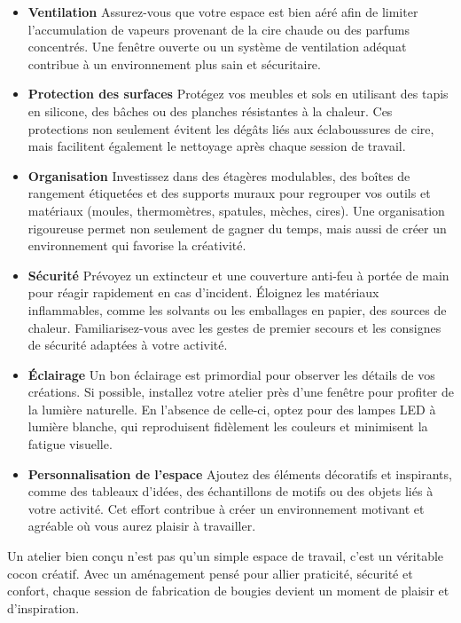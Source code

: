 \documentclass[11pt,fleqn,onecolumn,oneside]{book}
\begin{document}
\begin{itemize}
    \item \textbf{Ventilation} 
    Assurez-vous que votre espace est bien aéré afin de limiter l’accumulation de vapeurs provenant de la cire chaude ou des parfums concentrés. Une fenêtre ouverte ou un système de ventilation adéquat contribue à un environnement plus sain et sécuritaire.

    \item \textbf{Protection des surfaces} 
    Protégez vos meubles et sols en utilisant des tapis en silicone, des bâches ou des planches résistantes à la chaleur. Ces protections non seulement évitent les dégâts liés aux éclaboussures de cire, mais facilitent également le nettoyage après chaque session de travail.

    \item \textbf{Organisation} 
    Investissez dans des étagères modulables, des boîtes de rangement étiquetées et des supports muraux pour regrouper vos outils et matériaux (moules, thermomètres, spatules, mèches, cires). Une organisation rigoureuse permet non seulement de gagner du temps, mais aussi de créer un environnement qui favorise la créativité.

    \item \textbf{Sécurité} 
    Prévoyez un extincteur et une couverture anti-feu à portée de main pour réagir rapidement en cas d’incident. Éloignez les matériaux inflammables, comme les solvants ou les emballages en papier, des sources de chaleur. Familiarisez-vous avec les gestes de premier secours et les consignes de sécurité adaptées à votre activité.

    \item \textbf{Éclairage} 
    Un bon éclairage est primordial pour observer les détails de vos créations. Si possible, installez votre atelier près d’une fenêtre pour profiter de la lumière naturelle. En l’absence de celle-ci, optez pour des lampes LED à lumière blanche, qui reproduisent fidèlement les couleurs et minimisent la fatigue visuelle.

    \item \textbf{Personnalisation de l’espace}
    Ajoutez des éléments décoratifs et inspirants, comme des tableaux d’idées, des échantillons de motifs ou des objets liés à votre activité. Cet effort contribue à créer un environnement motivant et agréable où vous aurez plaisir à travailler.
\end{itemize}

\begin{corollary}
Un atelier bien conçu n’est pas qu’un simple espace de travail, c’est un véritable cocon créatif. Avec un aménagement pensé pour allier praticité, sécurité et confort, chaque session de fabrication de bougies devient un moment de plaisir et d’inspiration.
\end{corollary}
\end{document}
